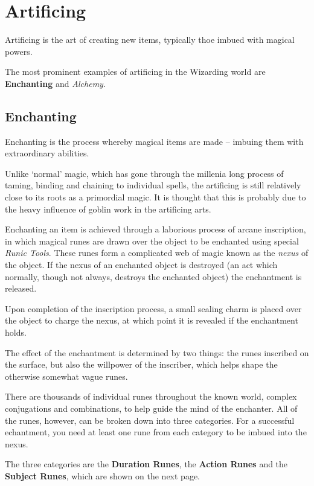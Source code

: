 \chapter{Artificing}\label{S:Artificing}


Artificing is the art of creating new items, typically thoe imbued with magical powers. 

The most prominent examples of artificing in the Wizarding world are {\bf Enchanting} and {\it Alchemy}.

\section{Enchanting}
\label{S:Enchanting}

Enchanting is the process whereby magical items are made – imbuing them with extraordinary abilities. 

Unlike `normal' magic, which has gone through the millenia long process of taming, binding and chaining to individual spells, the artificing is still relatively close to its roots as a primordial magic. It is thought that this is probably due to the heavy influence of goblin work in the artificing arts. 

Enchanting an item is achieved through a laborious process of arcane inscription, in which magical runes are drawn over the object to be enchanted using special {\it Runic Tools}. These runes form a complicated web of magic known as the {\it nexus} of the object. If the nexus of an enchanted object is destroyed (an act which normally, though not always, destroys the enchanted object) the enchantment is released. 

Upon completion of the inscription process, a small sealing charm is placed over the object to charge the nexus, at which point it is revealed if the enchantment holds. 

The effect of the enchantment is determined by two things: the runes inscribed on the surface, but also the willpower of the inscriber, which helps shape the otherwise somewhat vague runes. 

There are thousands of individual runes throughout the known world, complex conjugations and combinations, to help guide the mind of the enchanter. All of the runes, however, can be broken down into three categories. For a successful echantment, you need at least one rune from each category to be imbued into the nexus. 

The three categories are the {\bf Duration Runes}, the {\bf Action Runes} and the {\bf Subject Runes}, which are shown on the next page. 

